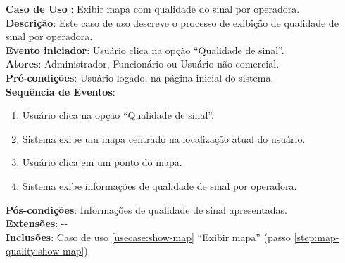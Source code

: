 \documentclass[]{politex}
\begin{document}
\noindent \textbf{Caso de Uso }: Exibir mapa com qualidade do sinal por
operadora. \\
\textbf{Descrição}: Este caso de uso descreve o processo de exibição de
qualidade de sinal por operadora. \\
\textbf{Evento iniciador}: Usuário clica na opção ``Qualidade de sinal''. \\
\textbf{Atores}: Administrador, Funcionário ou Usuário não-comercial. \\
\textbf{Pré-condições}: Usuário logado, na página inicial do sistema. \\
\textbf{Sequência de Eventos}:
\begin{enumerate}
\item Usuário clica na opção ``Qualidade de sinal''.
\item\label{step:map-quality:show-map} Sistema exibe um mapa centrado na localização atual do usuário.
\item Usuário clica em um ponto do mapa.
\item Sistema exibe informações de qualidade de sinal por operadora.
\end{enumerate}
\textbf{Pós-condições}: Informações de qualidade de sinal apresentadas. \\
\textbf{Extensões}: -{}- \\
\textbf{Inclusões}: Caso de uso \ref{usecase:show-map} ``Exibir mapa'' (passo \ref{step:map-quality:show-map}) \\
\end{document}
